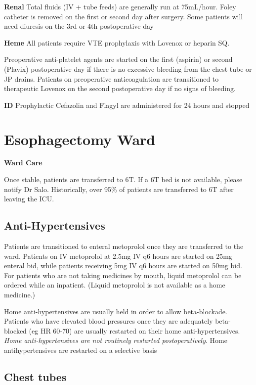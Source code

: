 \documentclass[
]{book}
\begin{document}
\textbf{Renal}
Total fluids (IV + tube feeds) are generally run at 75mL/hour. Foley catheter is removed on the first or second day after surgery. Some patients will need diuresis on the 3rd or 4th postoperative day

\textbf{Heme}
All patients require VTE prophylaxis with Lovenox or heparin SQ.

Preoperative anti-platelet agents are started on the first (aspirin) or second (Plavix) postoperative day if there is no excessive bleeding from the chest tube or JP drains. Patients on preoperative anticoagulation are transitioned to therapeutic Lovenox on the second postoperative day if no signs of bleeding.

\textbf{ID}
Prophylactic Cefazolin and Flagyl are administered for 24 hours and stopped

\hypertarget{esophagectomy-ward}{%
\chapter{Esophagectomy Ward}\label{esophagectomy-ward}}

\textbf{Ward Care}

Once stable, patients are transferred to 6T. If a 6T bed is not available, please notify Dr Salo. Historically, over 95\% of patients are transferred to 6T after leaving the ICU.

\hypertarget{anti-hypertensives}{%
\section{Anti-Hypertensives}\label{anti-hypertensives}}

Patients are transitioned to enteral metoprolol once they are transferred to the ward. Patients on IV metoprolol at 2.5mg IV q6 hours are started on 25mg enteral bid, while patients receiving 5mg IV q6 hours are started on 50mg bid. For patients who are not taking medicines by mouth, liquid metoprolol can be ordered while an inpatient. (Liquid metoprolol is not available as a home medicine.)

Home anti-hypertensives are usually held in order to allow beta-blockade. Patients who have elevated blood pressures once they are adequately beta-blocked (eg HR 60-70) are usually restarted on their home anti-hypertensives. \emph{Home anti-hypertensives are not routinely restarted postoperatively}. Home antihypertensives are restarted on a selective basis

\hypertarget{chest-tubes}{%
\section{Chest tubes}\label{chest-tubes}}
\end{document}
